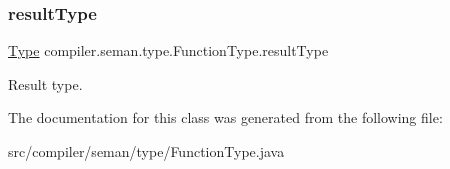 \subsubsection{\texorpdfstring{result\+Type}{resultType}}
{\footnotesize\ttfamily \hyperlink{classcompiler_1_1seman_1_1type_1_1_type}{Type} compiler.\+seman.\+type.\+Function\+Type.\+result\+Type}

Result type. 

The documentation for this class was generated from the following file\+:\begin{DoxyCompactItemize}
\item 
src/compiler/seman/type/Function\+Type.\+java\end{DoxyCompactItemize}
